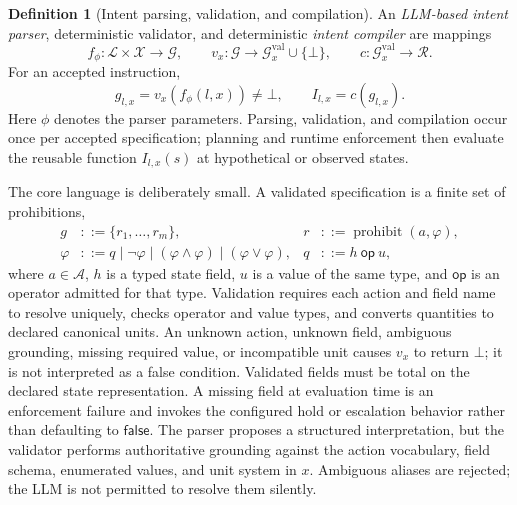 \documentclass[journal]{IEEEtran}
\theoremstyle{definition}
\newtheorem{definition}{Definition}[section]
\newcommand{\cA}{\mathcal{A}}
\newcommand{\cL}{\mathcal{L}}
\newcommand{\cX}{\mathcal{X}}
\newcommand{\cG}{\mathcal{G}}
\newcommand{\cR}{\mathcal{R}}
\begin{document}
\begin{definition}[Intent parsing, validation, and compilation]
An \emph{LLM-based intent parser}, deterministic validator, and deterministic
\emph{intent compiler} are mappings
\begin{equation}
  f_\phi : \cL \times \cX \to \cG,
  \qquad
  v_x:\cG\to\cG_x^{\mathrm{val}}\cup\{\bot\},
  \qquad
  c : \cG_x^{\mathrm{val}}\to\cR.
  \label{eq:llm_map}
\end{equation}
For an accepted instruction,
\begin{equation}
  g_{l,x}=v_x\!\left(f_\phi(l,x)\right)\neq\bot,
  \qquad
  I_{l,x}=c(g_{l,x}).
  \label{eq:validated_compilation}
\end{equation}
Here $\phi$ denotes the parser parameters. Parsing, validation, and compilation
occur once per accepted specification; planning and runtime enforcement then
evaluate the reusable function $I_{l,x}(s)$ at hypothetical or observed
states.
\end{definition}

The core language is deliberately small. A validated specification is a finite
set of prohibitions,
\begin{align}
  g &::= \{r_1,\ldots,r_m\},
  & r &::= \operatorname{prohibit}(a,\varphi), \nonumber\\
  \varphi &::= q \mid \neg\varphi \mid
  (\varphi\wedge\varphi) \mid (\varphi\vee\varphi),
  & q &::= h\ \mathsf{op}\ u,
  \label{eq:intent_grammar}
\end{align}
where $a\in\cA$, $h$ is a typed state field, $u$ is a value of the same type,
and $\mathsf{op}$ is an operator admitted for that type. Validation requires
each action and field name to resolve uniquely, checks operator and value
types, and converts quantities to declared canonical units. An unknown action,
unknown field, ambiguous grounding, missing required value, or incompatible
unit causes $v_x$ to return $\bot$; it is not interpreted as a false condition.
Validated fields must be total on the declared state representation. A missing
field at evaluation time is an enforcement failure and invokes the configured
hold or escalation behavior rather than defaulting to $\mathsf{false}$.
The parser proposes a structured interpretation, but the validator performs
authoritative grounding against the action vocabulary, field schema,
enumerated values, and unit system in $x$. Ambiguous aliases are rejected; the
LLM is not permitted to resolve them silently.
\end{document}
